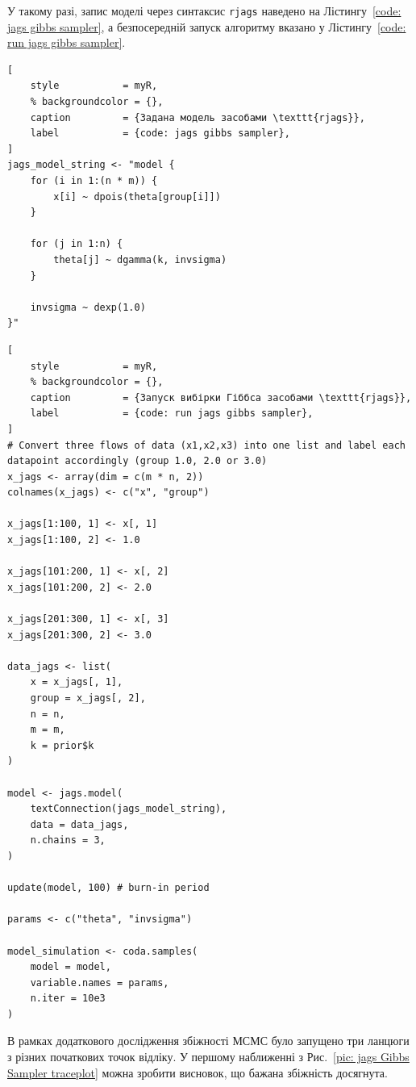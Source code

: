 У такому разі, запис моделі через синтаксис \texttt{rjags} наведено на Лістингу~\ref{code: jags gibbs sampler}, а безпосередній запуск алгоритму вказано у Лістингу~\ref{code: run jags gibbs sampler}.

\vspace{0.4cm}
\begin{lstlisting}[
    style           = myR, 
    % backgroundcolor = {},
    caption         = {Задана модель засобами \texttt{rjags}},
    label           = {code: jags gibbs sampler},
]
jags_model_string <- "model {
    for (i in 1:(n * m)) {
        x[i] ~ dpois(theta[group[i]])
    }

    for (j in 1:n) {
        theta[j] ~ dgamma(k, invsigma)
    }

    invsigma ~ dexp(1.0)
}"
\end{lstlisting}

\vspace{0.4cm}
\begin{lstlisting}[
    style           = myR, 
    % backgroundcolor = {},
    caption         = {Запуск вибірки Гіббса засобами \texttt{rjags}},
    label           = {code: run jags gibbs sampler},
]
# Convert three flows of data (x1,x2,x3) into one list and label each datapoint accordingly (group 1.0, 2.0 or 3.0)
x_jags <- array(dim = c(m * n, 2))
colnames(x_jags) <- c("x", "group")

x_jags[1:100, 1] <- x[, 1]
x_jags[1:100, 2] <- 1.0

x_jags[101:200, 1] <- x[, 2]
x_jags[101:200, 2] <- 2.0

x_jags[201:300, 1] <- x[, 3]
x_jags[201:300, 2] <- 3.0

data_jags <- list(
    x = x_jags[, 1],
    group = x_jags[, 2],
    n = n,
    m = m,
    k = prior$k
)

model <- jags.model(
    textConnection(jags_model_string),
    data = data_jags,
    n.chains = 3,
)

update(model, 100) # burn-in period

params <- c("theta", "invsigma")

model_simulation <- coda.samples(
    model = model,
    variable.names = params,
    n.iter = 10e3
)
\end{lstlisting}

\vspace{0.4cm}
В рамках додаткового дослідження збіжності МСМС було запущено три ланцюги з різних початкових точок відліку. У першому наближенні з Рис.~\ref{pic: jags Gibbs Sampler traceplot} можна зробити висновок, що бажана збіжність досягнута. 

